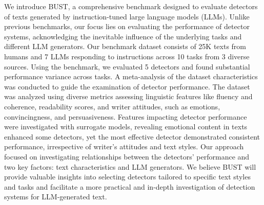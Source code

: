 We introduce BUST, a comprehensive benchmark designed to evaluate detectors of texts generated by instruction-tuned large language models (LLMs). Unlike previous benchmarks, our focus lies on evaluating the performance of detector systems, acknowledging the inevitable influence of the underlying tasks and different LLM generators. Our benchmark dataset consists of 25K texts from humans and 7 LLMs responding to instructions across 10 tasks from 3 diverse sources. Using the benchmark, we evaluated 5 detectors and found substantial performance variance across tasks. A meta-analysis of the dataset characteristics was conducted to guide the examination of detector performance. The dataset was analyzed using diverse metrics assessing linguistic features like fluency and coherence, readability scores, and writer attitudes, such as emotions, convincingness, and persuasiveness. Features impacting detector performance were investigated with surrogate models, revealing emotional content in texts enhanced some detectors, yet the most effective detector demonstrated consistent performance, irrespective of writer’s attitudes and text styles. Our approach focused on investigating relationships between the detectors' performance and two key factors: text characteristics and LLM generators. We believe BUST will provide valuable insights into selecting detectors tailored to specific text styles and tasks and facilitate a more practical and in-depth investigation of detection systems for LLM-generated text.